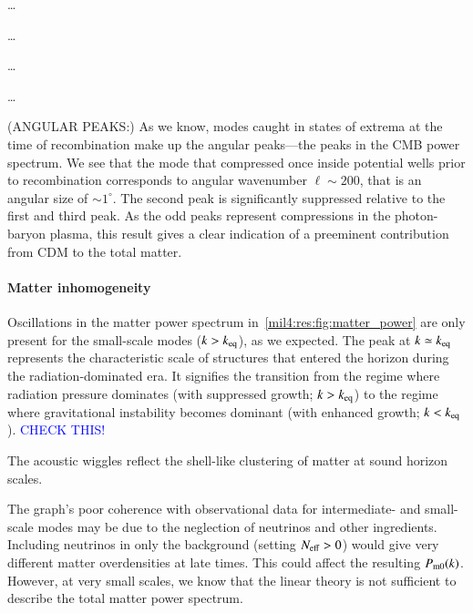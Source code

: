 \dots

\dots 

\dots 

\dots

(ANGULAR PEAKS:) As we know, modes caught in states of extrema at the time of recombination make up the angular peaks---the peaks in the CMB power spectrum. We see that the mode that compressed once inside potential wells prior to recombination corresponds to angular wavenumber $\ell\sim 200$, that is an angular size of $\sim 1^\circ$. The second peak is significantly suppressed relative to the first and third peak. As the odd peaks represent compressions in the photon-baryon plasma, this result gives a clear indication of a preeminent contribution from CDM to the total matter.  




\paragraph{Matter inhomogeneity}
Oscillations in the matter power spectrum in~\cref{mil4:res:fig:matter_power} are only present for the small-scale modes ($k>k_\mathrm{eq}$), as we expected. The peak at $k\simeq k_\mathrm{eq}$ represents the characteristic scale of structures that entered the horizon during the radiation-dominated era. It signifies the transition from the regime where radiation pressure dominates (with suppressed growth; $k>k_\mathrm{eq}$) to the regime where gravitational instability becomes dominant (with enhanced growth; $k<k_\mathrm{eq}$). \textcolor{blue}{CHECK THIS!} 

The acoustic wiggles reflect the shell-like clustering of matter at sound horizon scales. 

The graph's poor coherence with observational data for intermediate- and small-scale modes may be due to the neglection of neutrinos and other ingredients. Including neutrinos in only the background (setting $N_\mathrm{eff}> 0$) would give very different matter overdensities at late times. This could affect the resulting $P_\mathrm{m0}(k)$. However, at very small scales, we know that the linear theory is not sufficient to describe the total matter power spectrum.
